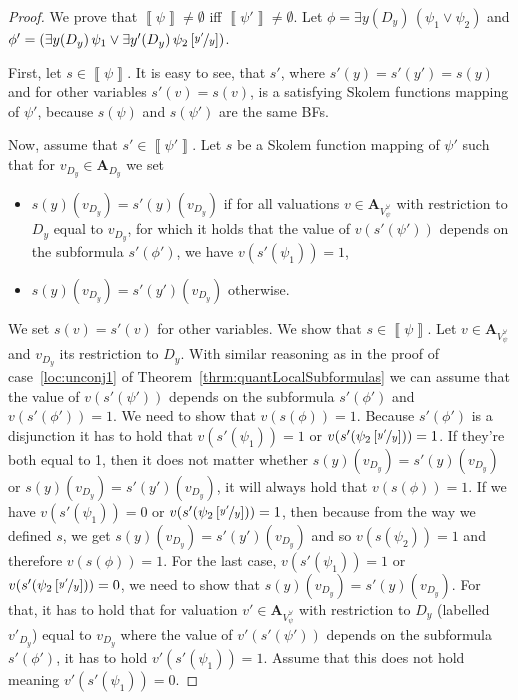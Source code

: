 \documentclass[
  digital, %
  color,
  twoside, %
  table,   %
  nolof,     %
  nolot,     %
]{fithesis3}
\theoremstyle{definition}
\theoremstyle{remark}
\newcommand{\seman}[1]{\left\llbracket {#1} \right\rrbracket}
\newcommand{\substitute}[2]{\left[ \nicefrac{#2}{#1} \right]}
\newcommand{\valtns}[1]{\mathbf{A}_{#1}}
\newcommand{\uvars}[1]{V_{#1}^{\forall}}
\newcommand{\itholds}{\,}
\begin{document}
\begin{proof}
  We prove that $\seman{\psi} \not= \emptyset$ iff $\seman{\psi'} \not= \emptyset$. Let $\phi = \exists y(D_y) \itholds (\psi_1 \lor \psi_2)$ and $\phi' = (\exists y(D_y) \itholds \psi_1 \lor \exists y'(D_y) \itholds \psi_2\substitute{y}{y'})$. 
  
  First, let $s \in \seman{\psi}$. It is easy to see, that $s'$, where $s'(y) = s'(y') = s(y)$ and for other variables $s'(v) = s(v)$, is a satisfying Skolem functions mapping of $\psi'$, because $s(\psi)$ and $s(\psi')$ are the same BFs.
  
  Now, assume that $s' \in \seman{\psi'}$. Let $s$ be a Skolem function mapping of $\psi'$ such that for $v_{D_y} \in \valtns{D_y}$ we set 
  \begin{itemize}
      \item $s(y)(v_{D_y}) = s'(y)(v_{D_y})$ if for all valuations $v \in \valtns{\uvars{\psi}}$ with restriction to $D_y$ equal to $v_{D_y}$, for which it holds that the value of $v(s'(\psi'))$ depends on the subformula $s'(\phi')$, we have $v(s'(\psi_1)) = 1$,
      \item $s(y)(v_{D_y}) = s'(y')(v_{D_y})$ otherwise.
  \end{itemize}
  We set $s(v) = s'(v)$ for other variables. We show that $s \in \seman{\psi}$. Let $v \in \valtns{\uvars{\psi}}$ and $v_{D_y}$ its restriction to $D_y$. With similar reasoning as in the proof of case~\eqref{loc:unconj1} of Theorem~\ref{thrm:quantLocalSubformulas} we can assume that the value of $v(s'(\psi'))$ depends on the subformula $s'(\phi')$ and $v(s'(\phi')) = 1$. We need to show that $v(s(\phi)) = 1$. Because $s'(\phi')$ is a disjunction it has to hold that $v(s'(\psi_1)) = 1$ or $v(s'(\psi_2\substitute{y}{y'})) = 1$. If they're both equal to 1, then it does not matter whether $s(y)(v_{D_y}) = s'(y)(v_{D_y})$ or $s(y)(v_{D_y}) = s'(y')(v_{D_y})$, it will always hold that $v(s(\phi)) = 1$. If we have $v(s'(\psi_1)) = 0$ or $v(s'(\psi_2\substitute{y}{y'})) = 1$, then because from the way we defined $s$, we get $s(y)(v_{D_y}) = s'(y')(v_{D_y})$ and so $v(s(\psi_2)) = 1$ and therefore $v(s(\phi)) = 1$. For the last case, $v(s'(\psi_1)) = 1$ or $v(s'(\psi_2\substitute{y}{y'})) = 0$, we need to show that $s(y)(v_{D_y}) = s'(y)(v_{D_y})$. For that, it has to hold that for valuation $v' \in \valtns{\uvars{\psi}}$ with restriction to $D_y$ (labelled $v'_{D_y}$) equal to $v_{D_y}$ where the value of $v'(s'(\psi'))$ depends on the subformula $s'(\phi')$, it has to hold $v'(s'(\psi_1)) = 1$. Assume that this does not hold meaning $v'(s'(\psi_1)) = 0$. %

\end{proof}
\end{document}
